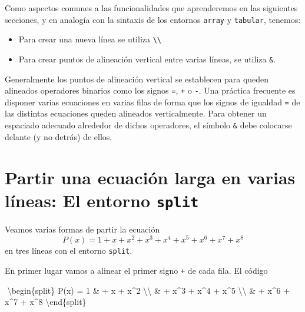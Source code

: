 \documentclass[
  letterpaper,
  DIV=11,
  numbers=noendperiod]{scrartcl}
\newenvironment{Shaded}{\begin{snugshade}}{\end{snugshade}}
\newcommand{\ExtensionTok}[1]{\textcolor[rgb]{0.00,0.23,0.31}{#1}}
\newcommand{\KeywordTok}[1]{\textcolor[rgb]{0.00,0.23,0.31}{#1}}
\newcommand{\NormalTok}[1]{\textcolor[rgb]{0.00,0.23,0.31}{#1}}
\newcommand{\SpecialCharTok}[1]{\textcolor[rgb]{0.37,0.37,0.37}{#1}}
\newcommand{\SpecialStringTok}[1]{\textcolor[rgb]{0.13,0.47,0.30}{#1}}
\providecommand{\tightlist}{%
  \setlength{\itemsep}{0pt}\setlength{\parskip}{0pt}}\usepackage{longtable,booktabs,array}
\begin{document}
Como aspectos comunes a las funcionalidades que aprenderemos en las
siguientes secciones, y en analogía con la sintaxis de los entornos
\texttt{array} y \texttt{tabular}, tenemos:

\begin{itemize}
\tightlist
\item
  Para crear una nueva línea se utiliza
  \texttt{\textbackslash{}\textbackslash{}}
\item
  Para crear puntos de alineación vertical entre varias líneas, se
  utiliza \texttt{\&}.
\end{itemize}

Generalmente los puntos de alineación vertical se establecen para queden
alineados operadores binarios como los signos \texttt{=}, \texttt{+} o
\texttt{-}. Una práctica frecuente es disponer varias ecuaciones en
varias filas de forma que los signos de igualdad \texttt{=} de las
distintas ecuaciones queden alineados verticalmente. Para obtener un
espaciado adecuado alrededor de dichos operadores, el símbolo
\texttt{\&} debe colocarse delante (y no detrás) de ellos.

\hypertarget{partir-una-ecuaciuxf3n-larga-en-varias-luxedneas-el-entorno-split}{%
\section{\texorpdfstring{Partir una ecuación larga en varias líneas: El
entorno
\texttt{split}}{Partir una ecuación larga en varias líneas: El entorno split}}\label{partir-una-ecuaciuxf3n-larga-en-varias-luxedneas-el-entorno-split}}

Veamos varias formas de partir la ecuación \[
P(x) = 1  + x + x^2 + x^3 + x^4 + x^5 + x^6 + x^7 + x^8
\] en tres líneas con el entorno \texttt{split}.

En primer lugar vamos a alinear el primer signo \texttt{+} de cada fila.
El código

\begin{Shaded}
\begin{Highlighting}[]
\SpecialStringTok{$$}
\KeywordTok{\textbackslash{}begin}\NormalTok{\{}\ExtensionTok{split}\NormalTok{\}}
\SpecialStringTok{P(x) = 1 \& + x + x\^{}2 }\SpecialCharTok{\textbackslash{}\textbackslash{}}
\SpecialStringTok{         \& + x\^{}3 + x\^{}4 + x\^{}5 }\SpecialCharTok{\textbackslash{}\textbackslash{}}
\SpecialStringTok{         \& + x\^{}6 + x\^{}7 + x\^{}8}
\KeywordTok{\textbackslash{}end}\NormalTok{\{}\ExtensionTok{split}\NormalTok{\}}
\SpecialStringTok{$$}
\end{Highlighting}
\end{Shaded}
\end{document}
